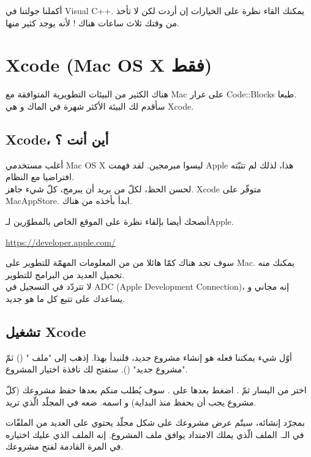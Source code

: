 أكملنا جولتنا في
\textenglish{Visual C++}.
يمكنك القاء نظرة على
الخيارات
إن أردت لكن لا تأخذ من وقتك ثلاث ساعات هناك ! لأنه يوجد كثير منها.

\section{\textenglish{Xcode} (\textenglish{Mac OS X} فقط)}

هناك الكثير من البيئات التطويرية المتوافقة مع
\textenglish{Mac}
على غرار
\textenglish{Code::Blocks}
طبعا.\\
سأقدم لك البيئة الأكثر شهرة في الماك و هي
\textenglish{Xcode}.

\subsection{\textenglish{Xcode}،
 أين أنت ؟}

أغلب مستخدمي
\textenglish{Mac OS X}
ليسوا مبرمجين. لقد فهمت
\textenglish{Apple}
هذا، لذلك لم تثبّته افتراضيا مع النظام.\\
لحسن الحظ، لكلّ من يريد أن يبرمج، كلّ شيء جاهز.
\textenglish{Xcode}
متوفّر على
\textenglish{MacAppStore}.
ابدأ بأخذه من هناك.

أنصحك أيضا بإلقاء نظرة على الموقع الخاص بالمطوّرين لـ\textenglish{Apple}.

\url{https://developer.apple.com/}

سوف تجد هناك كمّا هائلا من من المعلومات المهمّة للتطوير على
\textenglish{Mac}.
يمكنك منه تحميل العديد من البرامج للتطوير.\\
لا تتردّد في التسجيل في
\textenglish{ADC} (\textenglish{Apple Development Connection})،
إنه مجاني و يساعدك على تتبع كل ما هو جديد.

\subsection{تشغيل \textenglish{Xcode}}

أوّل شيء يمكننا فعله هو إنشاء مشروع جديد، فلنبدأ بهذا. إذهب إلى
"ملف "
()
ثمّ
"مشروع جديد"
().
ستفتح لك نافذة اختيار المشروع.


اختر
من اليسار ثمّ
.
اضغط بعدها على
.
سوف يُطلب منكم بعدها حفظ مشروعك (كلّ مشروع يجب أن يحفظ منذ البداية) و اسمه. ضعه في المجلّد الّذي تريد.

بمجرّد إنشائه، سيتّم عرض مشروعك على شكل مجلّد يحتوي على العديد من الملفّات في الـ.
الملف الّذي يملك الامتداد
يوافق ملف المشروع. إنه الملف الذي عليك اختياره في المرة القادمة لفتح مشروعك.

